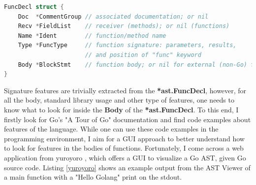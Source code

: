 \documentclass{seal_thesis}
\begin{document}
\begin{lstlisting}[caption=*ast.FuncDecl declaration in Go., label={funcdecl}, language=Go, frame=single]
FuncDecl struct {
	Doc  *CommentGroup // associated documentation; or nil
	Recv *FieldList    // receiver (methods); or nil (functions)
	Name *Ident        // function/method name
	Type *FuncType     // function signature: parameters, results, 
					   // and position of "func" keyword
	Body *BlockStmt    // function body; or nil for external (non-Go) function
}
\end{lstlisting}

\noindent Signature features are trivially extracted from the \textbf{*ast.FuncDecl}, however, for all the body, standard library usage and other type of features, one needs to know what to look for inside the \textbf{Body} of the \textbf{*ast.FuncDecl}. To this end, I firstly look for Go's "A Tour of Go" documentation \cite{atourofgo} and find code examples about features of the language. While one can use these code examples in the programming environment, I aim for a GUI approach to better understand how to look for features in the bodies of functions. Fortunately, I come across a web application from yuroyoro \cite{goastviewer}, which offers a GUI to visualize a Go AST, given Go source code. Listing \ref{yuroyoro} shows an example output from the AST Viewer of a main function with a "Hello Golang" print on the stdout.
\end{document}
